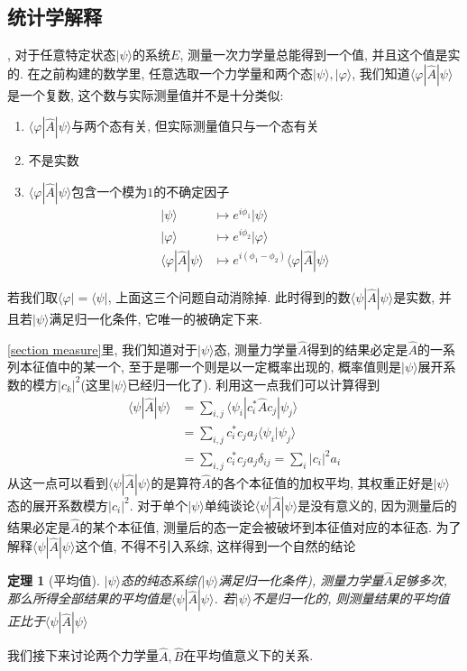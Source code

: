 \documentclass[a4paper,11pt]{book}
\newtheorem{theorem}{\hspace{2em}定理}[section]
\begin{document}
\subsection{统计学解释}
, 对于任意特定状态$|\psi\rangle$的系统$E$, 测量一次力学量总能得到一个值, 并且这个值是实的. 在之前构建的数学里, 任意选取一个力学量和两个态$|\psi\rangle,|\varphi\rangle$, 我们知道$\langle\varphi|\hat{A}|\psi\rangle$是一个复数, 这个数与实际测量值并不是十分类似:
\begin{enumerate}
  \item $\langle\varphi|\hat{A}|\psi\rangle$与两个态有关, 但实际测量值只与一个态有关
  \item 不是实数
  \item $\langle\varphi|\hat{A}|\psi\rangle$包含一个模为$1$的不确定因子
  \begin{equation*}
    \begin{split}
       |\psi\rangle & \longmapsto e^{i\phi_1}|\psi\rangle \\
       |\varphi\rangle & \longmapsto e^{i\phi_2}|\varphi\rangle \\
       \langle\varphi|\hat{A}|\psi\rangle & \longmapsto e^{i(\phi_1-\phi_2)}\langle\varphi|\hat{A}|\psi\rangle
    \end{split}
  \end{equation*}
\end{enumerate}
若我们取$\langle\varphi|=\langle\psi|$, 上面这三个问题自动消除掉. 此时得到的数$\langle\psi|\hat{A}|\psi\rangle$是实数, 并且若$|\psi\rangle$满足归一化条件, 它唯一的被确定下来.

\ref{section measure}里, 我们知道对于$|\psi\rangle$态, 测量力学量$\hat{A}$得到的结果必定是$\hat{A}$的一系列本征值中的某一个, 至于是哪一个则是以一定概率出现的, 概率值则是$|\psi\rangle$展开系数的模方$|c_k|^2$(这里$|\psi\rangle$已经归一化了). 利用这一点我们可以计算得到
\begin{equation*}
  \begin{split}
     \langle\psi|\hat{A}|\psi\rangle & =\sum_{i,j}\langle\psi_i|c_i^*\hat{A}c_j|\psi_j\rangle \\
       & =\sum_{i,j}c_i^*c_ja_j\langle\psi_i|\psi_j\rangle \\
       & =\sum_{i,j}c_i^*c_ja_j\delta_{ij}=\sum_{i}|c_i|^2a_i
  \end{split}
\end{equation*}
从这一点可以看到$\langle\psi|\hat{A}|\psi\rangle$的是算符$\hat{A}$的各个本征值的加权平均, 其权重正好是$|\psi\rangle$态的展开系数模方$|c_i|^2$. 对于单个$|\psi\rangle$单纯谈论$\langle\psi|\hat{A}|\psi\rangle$是没有意义的, 因为测量后的结果必定是$\hat{A}$的某个本征值, 测量后的态一定会被破坏到本征值对应的本征态. 为了解释$\langle\psi|\hat{A}|\psi\rangle$这个值, 不得不引入系综, 这样得到一个自然的结论
\begin{theorem}[平均值]
$|\psi\rangle$态的纯态系综($|\psi\rangle$满足归一化条件), 测量力学量$\hat{A}$足够多次, 那么所得全部结果的平均值是$\langle\psi|\hat{A}|\psi\rangle$. 若$|\psi\rangle$不是归一化的, 则测量结果的平均值正比于$\langle\psi|\hat{A}|\psi\rangle$
\end{theorem}
我们接下来讨论两个力学量$\hat{A},\hat{B}$在平均值意义下的关系.
\end{document}
